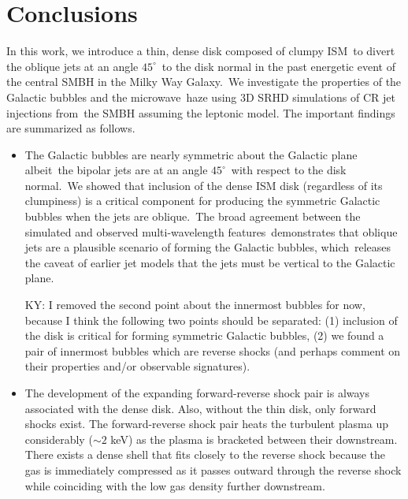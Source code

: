 \documentclass[fleqn,usenatbib,useAMS]{mnras}
\begin{document}
\section{Conclusions}
\label{Conclusions}
In this work, we introduce a thin, dense disk composed of clumpy ISM\
to divert the oblique jets at an angle $45^{\circ}$\
to the disk normal in the past energetic event of the central SMBH in the Milky Way Galaxy.\
We investigate the properties of the Galactic bubbles and the microwave\
haze using 3D SRHD simulations of CR jet injections from\
the SMBH assuming the leptonic model. The important findings are summarized as follows.

\begin{itemize}

\item The Galactic bubbles are nearly symmetric about the Galactic plane albeit\
      the bipolar jets are at an angle $45^{\circ}$\
      with respect to the disk normal.\
      We showed that inclusion of the dense ISM disk (regardless of its clumpiness) is a critical component for producing the symmetric Galactic bubbles when the jets are oblique.\
      The broad agreement between the simulated and observed multi-wavelength features\
      demonstrates that oblique jets are a plausible scenario of forming the Galactic bubbles, which\
      releases the caveat of earlier jet models that the jets must be vertical to the Galactic plane.\


      {\color{red} KY: I removed the second point about the innermost bubbles for now, because I think the following two points should be separated: (1) inclusion of the disk is critical for forming symmetric Galactic bubbles, (2) we found a pair of innermost bubbles which are reverse shocks (and perhaps comment on their properties and/or observable signatures).}
\item The development of the expanding forward-reverse shock pair is always associated with the dense disk. Also, without the thin disk, only forward shocks exist. The forward-reverse shock pair heats the turbulent plasma up considerably ($\sim2$ keV) as the plasma is bracketed between their downstream. There exists a dense shell that fits closely to the reverse shock because the gas is immediately compressed as it passes outward through the reverse shock while coinciding with the low gas density further downstream.


\end{itemize}
\end{document}
